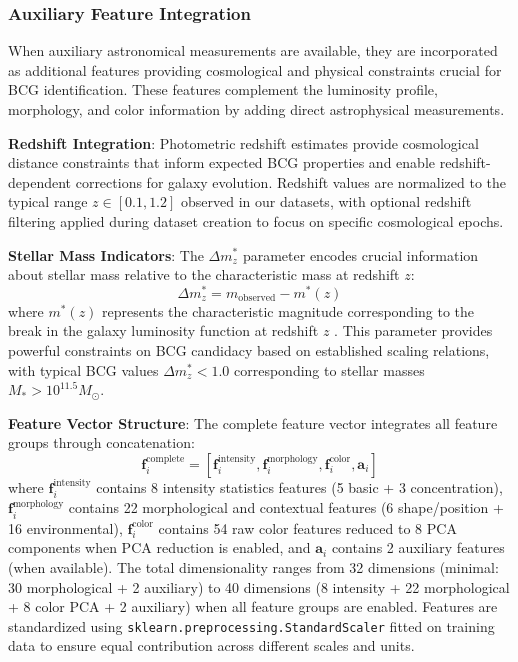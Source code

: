 \documentclass[twocolumn,10pt]{aastex631}
\begin{document}
\subsubsection{Auxiliary Feature Integration}

When auxiliary astronomical measurements are available, they are incorporated as additional features providing cosmological and physical constraints crucial for BCG identification. These features complement the luminosity profile, morphology, and color information by adding direct astrophysical measurements.

\textbf{Redshift Integration}: Photometric redshift estimates provide cosmological distance constraints that inform expected BCG properties and enable redshift-dependent corrections for galaxy evolution. Redshift values are normalized to the typical range $z \in [0.1, 1.2]$ observed in our datasets, with optional redshift filtering applied during dataset creation to focus on specific cosmological epochs.

\textbf{Stellar Mass Indicators}: The $\Delta m^*_z$ parameter encodes crucial information about stellar mass relative to the characteristic mass at redshift $z$:
\begin{equation}
\Delta m^*_z = m_{\text{observed}} - m^*(z)
\end{equation}
where $m^*(z)$ represents the characteristic magnitude corresponding to the break in the galaxy luminosity function at redshift $z$ \citep{Rykoff2016DES}. This parameter provides powerful constraints on BCG candidacy based on established scaling relations, with typical BCG values $\Delta m^*_z < 1.0$ corresponding to stellar masses $M_* > 10^{11.5} M_{\odot}$.

\textbf{Feature Vector Structure}: The complete feature vector integrates all feature groups through concatenation:
\begin{equation}
\mathbf{f}_i^{\text{complete}} = [\mathbf{f}_i^{\text{intensity}}, \mathbf{f}_i^{\text{morphology}}, \mathbf{f}_i^{\text{color}}, \mathbf{a}_i]
\end{equation}
where $\mathbf{f}_i^{\text{intensity}}$ contains 8 intensity statistics features (5 basic + 3 concentration), $\mathbf{f}_i^{\text{morphology}}$ contains 22 morphological and contextual features (6 shape/position + 16 environmental), $\mathbf{f}_i^{\text{color}}$ contains 54 raw color features reduced to 8 PCA components when PCA reduction is enabled, and $\mathbf{a}_i$ contains 2 auxiliary features (when available). The total dimensionality ranges from 32 dimensions (minimal: 30 morphological + 2 auxiliary) to 40 dimensions (8 intensity + 22 morphological + 8 color PCA + 2 auxiliary) when all feature groups are enabled. Features are standardized using \texttt{sklearn.preprocessing.StandardScaler} fitted on training data to ensure equal contribution across different scales and units.
\end{document}
